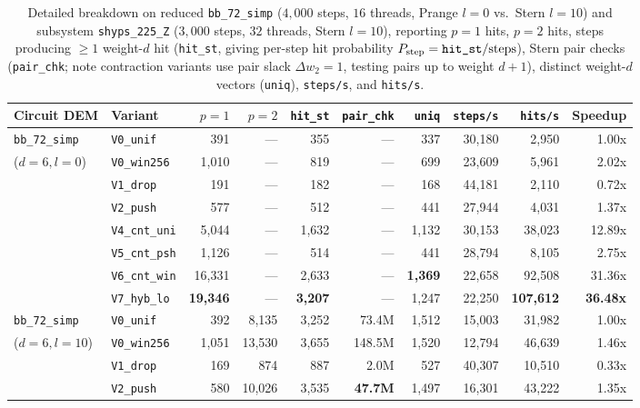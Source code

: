 \documentclass[12pt]{article}
\theoremstyle{definition}
\newcommand{\ttt}[1]{\texttt{#1}}
\begin{document}
\begin{table}[htbp]
\centering
\caption{Detailed breakdown on reduced \ttt{bb\_72\_simp} ($4{,}000$ steps, $16$ threads, Prange $l = 0$ vs.\ Stern
$l = 10$) and subsystem \ttt{shyps\_225\_Z} ($3{,}000$ steps, $32$ threads, Stern $l = 10$), reporting $p = 1$
hits, $p = 2$ hits, steps producing $\ge 1$ weight-$d$ hit (\ttt{hit\_st}, giving per-step hit probability
$P_{\mathrm{step}} = \text{\ttt{hit\_st}}/\text{steps}$), Stern pair checks (\ttt{pair\_chk}; note contraction
variants use pair slack $\Delta w_2 = 1$, testing pairs up to weight $d + 1$), distinct weight-$d$ vectors
(\ttt{uniq}), \ttt{steps/s}, and \ttt{hits/s}.}\label{tab:bench_detail}
\smallskip
\scriptsize
\setlength{\tabcolsep}{3.3pt}
\begin{tabular}{@{}llrrrrrrrr@{}}
\toprule
Circuit DEM & Variant & $p = 1$ & $p = 2$ & \ttt{hit\_st} & \ttt{pair\_chk} & \ttt{uniq} & \ttt{steps/s} &
  \ttt{hits/s} & Speedup \\
\midrule
\ttt{bb\_72\_simp} & \ttt{V0\_unif} & 391 & --- & 355 & --- & 337 & 30,180 & 2,950 & 1.00x \\
($d = 6, l = 0$) & \ttt{V0\_win256} & 1,010 & --- & 819 & --- & 699 & 23,609 & 5,961 & 2.02x \\
 & \ttt{V1\_drop} & 191 & --- & 182 & --- & 168 & 44,181 & 2,110 & 0.72x \\
 & \ttt{V2\_push} & 577 & --- & 512 & --- & 441 & 27,944 & 4,031 & 1.37x \\
 & \ttt{V4\_cnt\_uni} & 5,044 & --- & 1,632 & --- & 1,132 & 30,153 & 38,023 & 12.89x \\
 & \ttt{V5\_cnt\_psh} & 1,126 & --- & 514 & --- & 441 & 28,794 & 8,105 & 2.75x \\
 & \ttt{V6\_cnt\_win} & 16,331 & --- & 2,633 & --- & \textbf{1,369} & 22,658 & 92,508 & 31.36x \\
 & \ttt{V7\_hyb\_lo} & \textbf{19,346} & --- & \textbf{3,207} & --- & 1,247 & 22,250 & \textbf{107,612} &
   \textbf{36.48x} \\
\midrule
\ttt{bb\_72\_simp} & \ttt{V0\_unif} & 392 & 8,135 & 3,252 & 73.4M & 1,512 & 15,003 & 31,982 & 1.00x \\
($d = 6, l = 10$) & \ttt{V0\_win256} & 1,051 & 13,530 & 3,655 & 148.5M & 1,520 & 12,794 & 46,639 & 1.46x \\
 & \ttt{V1\_drop} & 169 & 874 & 887 & 2.0M & 527 & 40,307 & 10,510 & 0.33x \\
 & \ttt{V2\_push} & 580 & 10,026 & 3,535 & \textbf{47.7M} & 1,497 & 16,301 & 43,222 & 1.35x \\

\end{tabular}
\end{table}
\end{document}
